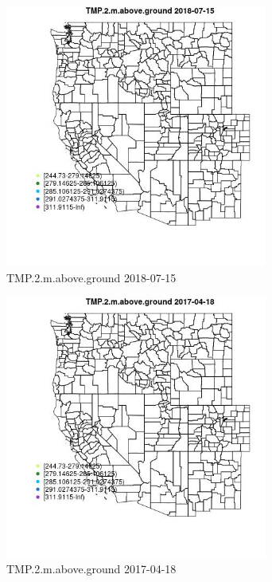 \begin{figure} 
\centering  
\includegraphics[width=0.77\textwidth]{Code_Outputs/Report_ML_input_PM25_Step4_part_e_de_duplicated_aveswNAs_MapObsTMP2maboveground2018-07-15.jpg} 
\caption{\label{fig:Report_ML_input_PM25_Step4_part_e_de_duplicated_aveswNAsMapObsTMP2maboveground2018-07-15}TMP.2.m.above.ground 2018-07-15} 
\end{figure} 
 

\clearpage 

\begin{figure} 
\centering  
\includegraphics[width=0.77\textwidth]{Code_Outputs/Report_ML_input_PM25_Step4_part_e_de_duplicated_aveswNAs_MapObsTMP2maboveground2017-04-18.jpg} 
\caption{\label{fig:Report_ML_input_PM25_Step4_part_e_de_duplicated_aveswNAsMapObsTMP2maboveground2017-04-18}TMP.2.m.above.ground 2017-04-18} 
\end{figure} 
 

